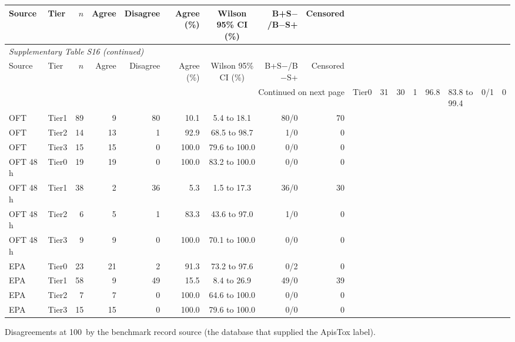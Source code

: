 \begin{longtable}{llrrrrcrr}

\toprule Source & Tier & $n$ & Agree & Disagree & Agree (\%) & Wilson 95\% CI (\%) & B+S$-$/B$-$S+ & Censored \\ \midrule\endfirsthead

\multicolumn{9}{l}{\textit{Supplementary Table S16 (continued)}} \\

\toprule Source & Tier & $n$ & Agree & Disagree & Agree (\%) & Wilson 95\% CI (\%) & B+S$-$/B$-$S+ & Censored \\ \midrule\endhead

\midrule\multicolumn{9}{r}{Continued on next page}\endfoot\bottomrule\endlastfoot

OFT & Tier0 & 31 & 30 & 1 & 96.8 & 83.8 to 99.4 & 0/1 & 0 \\
OFT & Tier1 & 89 & 9 & 80 & 10.1 & 5.4 to 18.1 & 80/0 & 70 \\
OFT & Tier2 & 14 & 13 & 1 & 92.9 & 68.5 to 98.7 & 1/0 & 0 \\
OFT & Tier3 & 15 & 15 & 0 & 100.0 & 79.6 to 100.0 & 0/0 & 0 \\
OFT 48 h & Tier0 & 19 & 19 & 0 & 100.0 & 83.2 to 100.0 & 0/0 & 0 \\
OFT 48 h & Tier1 & 38 & 2 & 36 & 5.3 & 1.5 to 17.3 & 36/0 & 30 \\
OFT 48 h & Tier2 & 6 & 5 & 1 & 83.3 & 43.6 to 97.0 & 1/0 & 0 \\
OFT 48 h & Tier3 & 9 & 9 & 0 & 100.0 & 70.1 to 100.0 & 0/0 & 0 \\
EPA & Tier0 & 23 & 21 & 2 & 91.3 & 73.2 to 97.6 & 0/2 & 0 \\
EPA & Tier1 & 58 & 9 & 49 & 15.5 & 8.4 to 26.9 & 49/0 & 39 \\
EPA & Tier2 & 7 & 7 & 0 & 100.0 & 64.6 to 100.0 & 0/0 & 0 \\
EPA & Tier3 & 15 & 15 & 0 & 100.0 & 79.6 to 100.0 & 0/0 & 0 \\

\end{longtable}\endgroup

Disagreements at 100~\ugbee by the benchmark record source (the database that supplied the ApisTox label).

\begingroup\footnotesize\setlength{\tabcolsep}{4pt}

